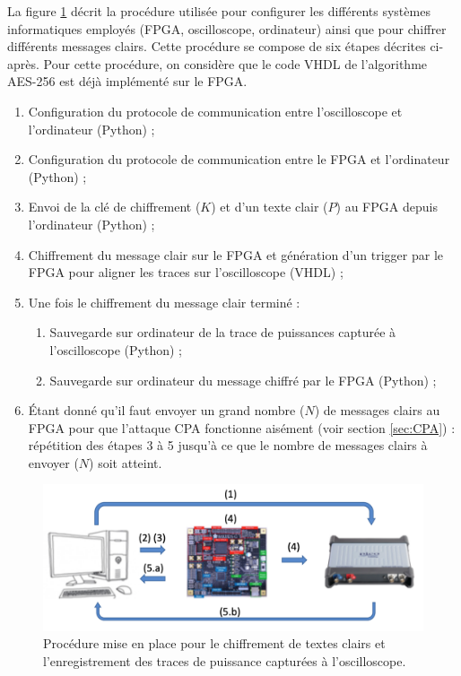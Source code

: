 \documentclass[oneside]{book}
\begin{document}
\hspace{-0.5cm}La figure \ref{fig:procedure_1} décrit la procédure utilisée pour configurer les différents systèmes informatiques employés (FPGA, oscilloscope, ordinateur) ainsi que pour chiffrer différents messages clairs. Cette procédure se compose de six étapes décrites ci-après. Pour cette procédure, on considère que le code VHDL de l'algorithme AES-256 est déjà implémenté sur le FPGA. 
\begin{enumerate}
\item Configuration du protocole de communication entre l'oscilloscope et l'ordinateur (Python)  ;
\item Configuration du protocole de communication entre le FPGA et l'ordinateur (Python) ;
\item Envoi de la clé de chiffrement ($K$) et d'un texte clair ($P$) au FPGA depuis l'ordinateur (Python)  ;
\item Chiffrement du message clair sur le FPGA et génération d'un trigger par le FPGA pour aligner les traces sur l'oscilloscope (VHDL) ;
\item Une fois le chiffrement du message clair terminé :
\begin{enumerate}
\item Sauvegarde sur ordinateur de la trace de puissances capturée à l'oscilloscope (Python) ;
\item Sauvegarde sur ordinateur du message chiffré par le FPGA (Python) ;
\end{enumerate}
\item Étant donné qu'il faut envoyer un grand nombre ($N$) de messages clairs au FPGA pour que l'attaque CPA fonctionne aisément (voir section \ref{sec:CPA}) : répétition des étapes 3 à 5 jusqu'à ce que le nombre de messages clairs à envoyer ($N$) soit atteint.
\end{enumerate}

\begin{figure}[htbp]
    \centering
    \includegraphics[scale=0.53]{image/procedure_1}
    \caption{Procédure mise en place pour le chiffrement de textes clairs et l'enregistrement des traces de puissance capturées à l'oscilloscope.}
    \label{fig:procedure_1} 
\end{figure}
\end{document}
